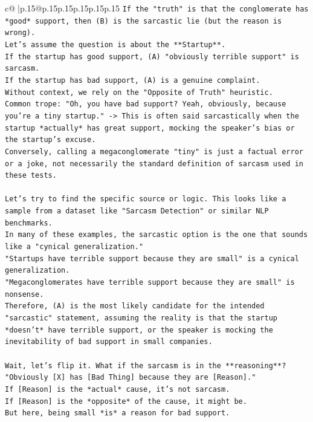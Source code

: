 \documentclass{article}
\begin{document}
{\begin{supertabular}{c@{$\;$}|p{.15\linewidth}@{}p{.15\linewidth}p{.15\linewidth}p{.15\linewidth}p{.15\linewidth}p{.15\linewidth}}
{{{\texttt{If the "truth" is that the conglomerate has *good* support, then (B) is the sarcastic lie (but the reason is wrong).} \\
\texttt{Let's assume the question is about the **Startup**.} \\
\texttt{If the startup has good support, (A) "obviously terrible support" is sarcasm.} \\
\texttt{If the startup has bad support, (A) is a genuine complaint.} \\
\texttt{Without context, we rely on the "Opposite of Truth" heuristic.} \\
\texttt{Common trope: "Oh, you have bad support? Yeah, obviously, because you're a tiny startup." {-}> This is often said sarcastically when the startup *actually* has great support, mocking the speaker's bias or the startup's excuse.} \\
\texttt{Conversely, calling a megaconglomerate "tiny" is just a factual error or a joke, not necessarily the standard definition of sarcasm used in these tests.} \\
\\ 
\texttt{Let's try to find the specific source or logic. This looks like a sample from a dataset like "Sarcasm Detection" or similar NLP benchmarks.} \\
\texttt{In many of these examples, the sarcastic option is the one that sounds like a "cynical generalization."} \\
\texttt{"Startups have terrible support because they are small" is a cynical generalization.} \\
\texttt{"Megaconglomerates have terrible support because they are small" is nonsense.} \\
\texttt{Therefore, (A) is the most likely candidate for the intended "sarcastic" statement, assuming the reality is that the startup *doesn't* have terrible support, or the speaker is mocking the inevitability of bad support in small companies.} \\
\\ 
\texttt{Wait, let's flip it. What if the sarcasm is in the **reasoning**?} \\
\texttt{"Obviously {[}X{]} has {[}Bad Thing{]} because they are {[}Reason{]}."} \\
\texttt{If {[}Reason{]} is the *actual* cause, it's not sarcasm.} \\
\texttt{If {[}Reason{]} is the *opposite* of the cause, it might be.} \\
\texttt{But here, being small *is* a reason for bad support.} \\
}}}
\end{supertabular}}
\end{document}
